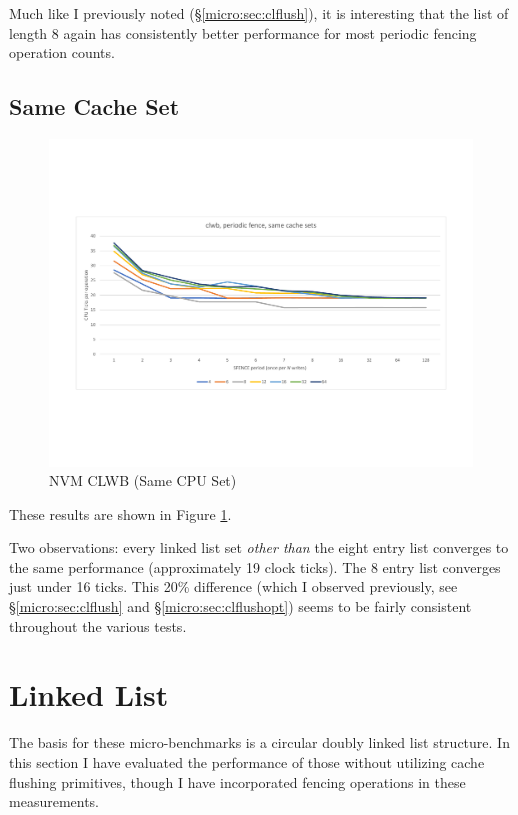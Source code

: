 Much like I previously noted (\S \ref{micro:sec:clflush}),
it is interesting that the list of length 8 again has consistently better performance for most periodic fencing operation counts.

\subsection{Same Cache Set}

\begin{figure}
    \centering
    \caption{NVM CLWB (Same CPU Set)}\label{micro:clwb:same}
    \includegraphics[scale=0.35]{micro/nvm-clwb-periodic-same.pdf}
\end{figure}

These results are shown in Figure \ref{micro:clwb:same}.

Two observations: every linked list set \textit{other than} the
eight entry list converges to the same performance (approximately 19 clock ticks).  The 8 entry list converges just under 16 ticks.  This 20\% difference (which I observed previously, see \S \ref{micro:sec:clflush} and \S \ref{micro:sec:clflushopt}) seems to
be fairly consistent throughout the various tests. 

\section{Linked List}

The basis for these micro-benchmarks is a circular doubly
linked list structure.  In this section I have evaluated the
performance of those without utilizing cache flushing primitives,
though I have incorporated fencing operations in these
measurements.

